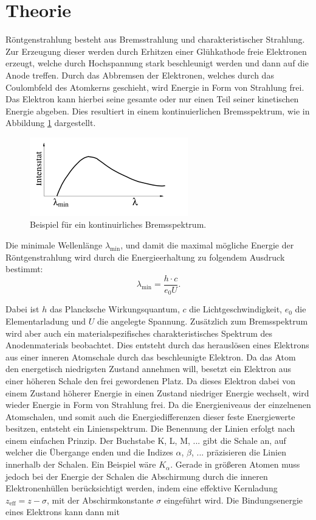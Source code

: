 \section{Theorie}
\label{sec:Theorie}
Röntgenstrahlung besteht aus Bremsstrahlung und charakteristischer Strahlung. Zur Erzeugung dieser werden durch Erhitzen
einer Glühkathode freie Elektronen erzeugt, welche durch Hochspannung stark beschleunigt werden und dann auf die Anode treffen. Durch das Abbremsen der Elektronen,
welches durch das Coulombfeld des Atomkerns geschieht, wird Energie in Form von Strahlung frei.
Das Elektron kann hierbei seine gesamte oder nur einen Teil seiner kinetischen Energie abgeben.
Dies resultiert in einem kontinuierlichen Bremsspektrum, wie in Abbildung \ref{fig:kontinuirlich} dargestellt.

\begin{figure}
  \centering
  \includegraphics{images/kontinuirlich.png}
  \caption{Beispiel für ein kontinuirliches Bremsspektrum.\cite{sample}}
  \label{fig:kontinuirlich}
\end{figure}
Die minimale Wellenlänge ${\lambda}_\text{min}$, und damit die maximal mögliche Energie der Röntgenstrahlung wird durch die Energieerhaltung zu folgendem Ausdruck bestimmt:
\begin{equation}
  {\lambda}_\text{min} = \frac{h \cdot c}{e_0 U} .
  \label{eqn:lambdamin}
\end{equation}

Dabei ist $h$ das Plancksche Wirkungsquantum, $c$ die Lichtgeschwindigkeit, $e_0$ die Elementarladung und $U$ die angelegte Spannung.
Zusätzlich zum Bremsspektrum wird aber auch ein materialspezifisches charakteristisches Spektrum des Anodenmaterials beobachtet.
Dies entsteht durch das herauslösen eines Elektrons aus einer inneren Atomschale durch das beschleunigte Elektron.
Da das Atom den energetisch niedrigsten Zustand annehmen will, besetzt ein Elektron aus einer höheren Schale den frei gewordenen Platz.
Da dieses Elektron dabei von einem Zustand höherer Energie in einen Zustand niedriger Energie wechselt, wird wieder Energie in Form von Strahlung frei.
Da die Energieniveaus der einzelnenen Atomschalen, und somit auch die Energiedifferenzen dieser feste Energiewerte besitzen, entsteht ein Linienspektrum.
Die Benennung der Linien erfolgt nach einem einfachen Prinzip.
Der Buchstabe K, L, M, ... gibt die Schale an, auf welcher die Übergange enden und die Indizes $\alpha$, $\beta$, ... präzisieren die Linien innerhalb der Schalen.
Ein Beispiel wäre $K_{\alpha}$. Gerade in größeren Atomen muss jedoch bei der Energie der Schalen die Abschirmung durch die inneren Elektronenhüllen berücksichtigt werden, indem
eine effektive Kernladung $z_\text{eff}= z - \sigma$, mit der Abschirmkonstante $\sigma$ eingeführt wird. Die Bindungsenergie eines Elektrons kann dann mit

